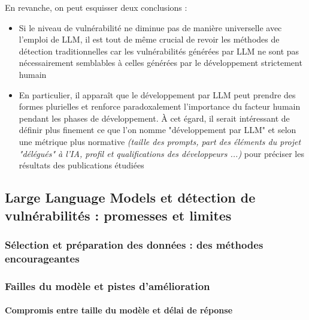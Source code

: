             En revanche, on peut esquisser deux conclusions :
            \begin{itemize}
                \item Si le niveau de vulnérabilité ne diminue pas de manière universelle avec
                l'emploi de LLM, il est tout de même crucial de revoir les méthodes de détection
                traditionnelles car les vulnérabilités générées par LLM ne sont pas nécessairement
                semblables à celles générées par le développement strictement humain
                \item En particulier, il apparaît que le développement par LLM peut prendre des
                formes plurielles et renforce paradoxalement l'importance du facteur humain pendant
                les phases de développement. À cet égard, il serait intéressant de définir plus
                finement ce que l'on nomme "développement par LLM" et selon une métrique plus
                normative
                \textit{(taille des prompts, part des éléments du projet "délégués" à l'IA, profil et qualifications des développeurs ...)}
                pour préciser les résultats des publications étudiées
        \end{itemize}

        \subsection{Large Language Models et détection de vulnérabilités : promesses et limites}

            \subsubsection{Sélection et préparation des données : des méthodes encourageantes}
            \subsubsection{Failles du modèle et pistes d'amélioration}
                \paragraph*{Compromis entre taille du modèle et délai de réponse}
